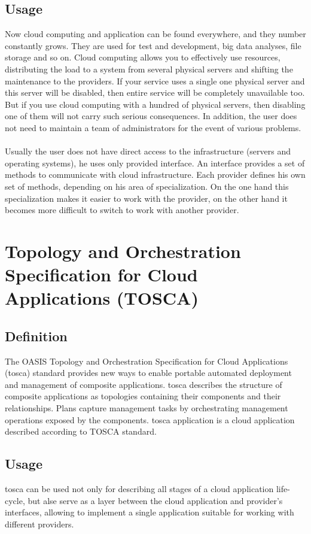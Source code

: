 \subsection{Usage}
Now cloud computing and application can be found everywhere, and they number constantly grows. \cite*{cloud_stat}
They are used for test and development, big data analyses, file storage and so on.
Cloud computing allows you to effectively use resources, distributing the load to a system from several physical servers and shifting the maintenance to the providers. 
If your service uses a single one physical server and this server will be disabled, then entire service will be completely unavailable too.
But if you use cloud computing with a hundred of physical servers, then disabling one of them will not carry such serious consequences.
In addition, the user does not need to maintain a team of administrators for the event of various problems.\\\\ 
Usually the user does not have direct access to the infrastructure (servers and operating systems), he uses only provided interface.
An interface provides a set of methods to communicate with cloud infrastructure. 
Each provider defines his own set of methods, depending on his area of specialization. 
On the one hand this specialization makes it easier to work with the provider, on the other hand it becomes more difficult to switch to work with another provider.

\section{Topology and Orchestration Specification for Cloud	Applications (TOSCA)} \label{sec:tosca}
\subsection*{Definition}
The OASIS \cite{oasis} Topology and Orchestration Specification for Cloud Applications (\gls{tosca}) standard provides new ways to enable portable automated deployment and management of composite applications.
\gls{tosca} describes the structure of composite applications as topologies containing their components and their relationships.
Plans capture management tasks by orchestrating management operations exposed by the components. \cite*{INBOOK-2014-01}
\gls{tosca} application is a cloud application described according to TOSCA standard.
\subsection*{Usage}
\gls{tosca} can be used not only for describing all stages of a cloud application life-cycle, but alse serve as a layer between the cloud application and provider's interfaces, allowing to implement a single application suitable for working with different providers. 
